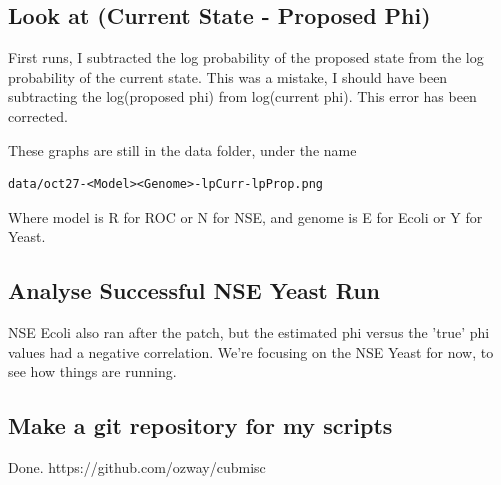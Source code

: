 \newpage
\subsection{Look at (Current State - Proposed Phi)}

First runs, I subtracted the log probability of the proposed state from the log probability of the current state. This was a mistake, I should have been subtracting the log(proposed phi) from log(current phi). This error has been corrected. 

These graphs are still in the data folder, under the name 
\begin{verbatim}
data/oct27-<Model><Genome>-lpCurr-lpProp.png
\end{verbatim}
Where model is R for ROC or N for NSE, and genome is E for Ecoli or Y for Yeast.




\newpage
\subsection{Analyse Successful NSE Yeast Run}

NSE Ecoli also ran after the patch, but the estimated phi versus the 'true' phi values had a negative correlation. We're focusing on the NSE Yeast for now, to see how things are running.












\newpage
\subsection{Make a git repository for my scripts}

Done. https://github.com/ozway/cubmisc







